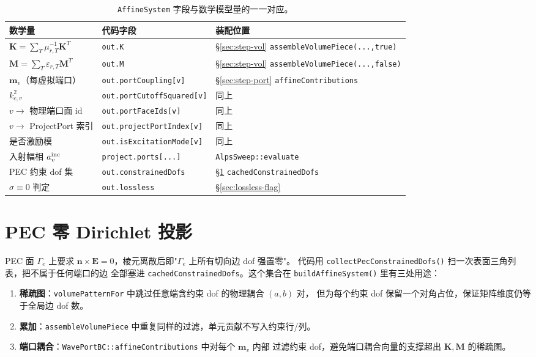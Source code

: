 \documentclass[UTF8,a4paper,11pt]{ctexart}
\newcommand{\code}[1]{\texttt{\small #1}}
\begin{document}
\begin{table}[h]
\centering
{\small
\setlength{\tabcolsep}{4pt}
\begin{tabular}{>{\raggedright\arraybackslash}p{}
                >{\raggedright\arraybackslash}p{}
                >{\raggedright\arraybackslash}p{}}
\toprule
数学量 & 代码字段 & 装配位置 \\ \midrule
$\bm K=\sum_T\mu_{r,T}^{-1}\bm K^T$       & \code{out.K}                & §\ref{sec:step-vol} \code{assembleVolumePiece(...,true)}  \\
$\bm M=\sum_T\varepsilon_{r,T}\bm M^T$    & \code{out.M}                & §\ref{sec:step-vol} \code{assembleVolumePiece(...,false)} \\
$\bm m_v$（每虚拟端口）                    & \code{out.portCoupling[v]}  & §\ref{sec:step-port} \code{affineContributions} \\
$k_{c,v}^{2}$                             & \code{out.portCutoffSquared[v]} & 同上 \\
$v\to$ 物理端口面 id                       & \code{out.portFaceIds[v]}   & 同上 \\
$v\to$ ProjectPort 索引                    & \code{out.projectPortIndex[v]} & 同上 \\
是否激励模                                  & \code{out.isExcitationMode[v]} & 同上 \\
入射幅相 $a_v^{\rm inc}$                    & \code{project.ports[...]} & \code{AlpsSweep::evaluate} \\
PEC 约束 dof 集                             & \code{out.constrainedDofs}  & §\ref{sec:pec} \code{cachedConstrainedDofs} \\
$\sigma\equiv0$ 判定                       & \code{out.lossless}         & §\ref{sec:lossless-flag} \\
\bottomrule
\end{tabular}
}
\caption{\code{AffineSystem} 字段与数学模型量的一一对应。}
\end{table}

\section{PEC 零 Dirichlet 投影}
\label{sec:pec}

PEC 面 $\Gamma_e$ 上要求 $\bm n\times\bm E=0$，棱元离散后即"$\Gamma_e$ 上所有切向边 dof 强置零"。
代码用 \code{collectPecConstrainedDofs()} 扫一次表面三角列表，把不属于任何端口的边
全部塞进 \code{cachedConstrainedDofs}。这个集合在 \code{buildAffineSystem()} 里有三处用途：
\begin{enumerate}[leftmargin=2em]
\item \textbf{稀疏图}：\code{volumePatternFor} 中跳过任意端含约束 dof 的物理耦合 $(a,b)$ 对，
但为每个约束 dof 保留一个对角占位，保证矩阵维度仍等于全局边 dof 数。
\item \textbf{累加}：\code{assembleVolumePiece} 中重复同样的过滤，单元贡献不写入约束行/列。
\item \textbf{端口耦合}：\code{WavePortBC::affineContributions} 中对每个 $\bm m_v$ 内部
过滤约束 dof，避免端口耦合向量的支撑超出 $\bm K,\bm M$ 的稀疏图。
\end{enumerate}
\end{document}
